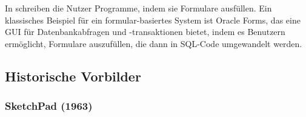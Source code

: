 \documentclass[ngerman]{article}
\begin{document}
\subsubsection{}
In  schreiben die Nutzer Programme, indem sie Formulare ausfüllen. 
Ein klassisches Beispiel für ein formular-basiertes System ist Oracle Forms, 
das eine GUI für Datenbankabfragen und -transaktionen bietet, indem es Benutzern ermöglicht, Formulare auszufüllen, die dann in SQL-Code umgewandelt werden. \cite{wikipediaOracleForms}

\subsection{Historische Vorbilder}

\subsubsection{SketchPad (1963)}
\label{sec:SketchPad}
\begingroup
\setlength\intextsep{4pt}
\end{document}
